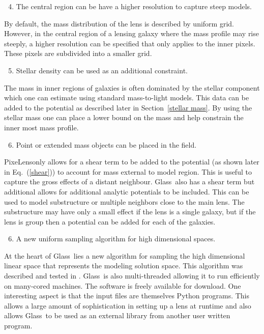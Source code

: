 \documentclass[onecolumn,galley]{mn2e}
\newcommand{\Glass}{{\sc Glass}}
\newcommand{\PixeLens}{{\sc PixeLens}}
\newcommand{\eqnref}[1] {Eq.~(\ref{#1})}
\newcommand{\secref}[1] {Section~\ref{#1}}
\begin{document}
%
\begin{enumerate}
  \setcounter{enumi}{3}
  \item The central region can be have a higher resolution to capture steep models. 
\end{enumerate}
%
By default, the mass distribution of the lens is described by uniform grid. However,
in the central region of a lensing galaxy where the mass profile may rise steeply,
a higher resolution can be specified that only applies to the inner pixels. These
pixels are subdivided into a smaller grid.
%
\begin{enumerate}
  \setcounter{enumi}{4}
  \item Stellar density can be used as an additional constraint.  
\end{enumerate}
%
The mass in inner regions of galaxies is often dominated by the stellar component
which one can estimate using standard mass-to-light models. This data can be added
to the potential as described later in \secref{stellar mass}. By using the stellar
mass one can place a lower bound on the mass and help constrain the inner most
mass profile.
%
\begin{enumerate}
  \setcounter{enumi}{5}
  \item Point or extended mass objects can be placed in the field.
\end{enumerate}
%
\PixeLens only allows for a shear term to be added to the potential (as shown
later in \eqnref{shear}) to account for mass external to model region. This
is useful to capture the gross effects of a distant neighbour. \Glass\ also
has a shear term but additional allows for additional analytic potentials to
be included. This can be used to model substructure or multiple neighbors close
to the main lens. The substructure may have only a small effect if the lens is
a single galaxy, but if the lens is group then a potential can be added for
each of the galaxies.
%
\begin{enumerate}
  \setcounter{enumi}{5}
  \item A new uniform sampling algorithm for high dimensional spaces.
\end{enumerate}
%
At the heart of \Glass\ lies a new algorithm for sampling the high dimensional
linear space that represents the modeling solution space. This algorithm was
described and tested in \cite{}. \Glass\ is also multi-threaded allowing it to
run efficiently on many-cored machines.  The software is freely available for
download. One interesting aspect is that the input files are themselves Python
programs. This allows a large amount of sophistication in setting up a lens at
runtime and also allows \Glass\ to be used as an external library from another
user written program.
\end{document}
